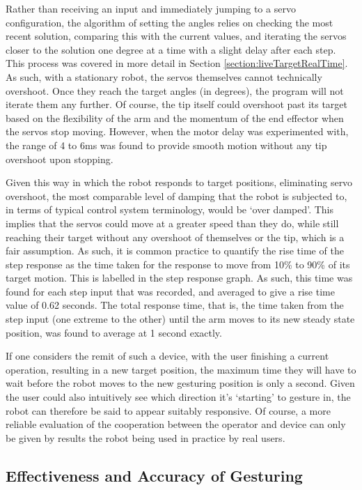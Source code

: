 \documentclass[11pt]{article}
\begin{document}
\pagebreak
Rather than receiving an input and immediately jumping to a servo configuration, the algorithm of setting the angles relies on checking the most recent solution, comparing this with the current values, and iterating the servos closer to the solution one degree at a time with a slight delay after each step. This process was covered in more detail in Section \ref{section:liveTargetRealTime}. As such, with a stationary robot, the servos themselves cannot technically overshoot. Once they reach the target angles (in degrees), the program will not iterate them any further. Of course, the tip itself could overshoot past its target based on the flexibility of the arm and the momentum of the end effector when the servos stop moving. However, when the motor delay was experimented with, the range of 4 to 6ms was found to provide smooth motion without any tip overshoot upon stopping.

Given this way in which the robot responds to target positions, eliminating servo overshoot, the most comparable level of damping that the robot is subjected to, in terms of typical control system terminology, would be `over damped'. This implies that the servos could move at a greater speed than they do, while still reaching their target without any overshoot of themselves or the tip, which is a fair assumption. As such, it is common practice to quantify the rise time of the step response as the time taken for the response to move from 10\% to 90\% of its target motion. This is labelled in the step response graph. As such, this time was found for each step input that was recorded, and averaged to give a rise time value of 0.62 seconds. The total response time, that is, the time taken from the step input (one extreme to the other) until the arm moves to its new steady state position, was found to average at 1 second exactly. 

If one considers the remit of such a device, with the user finishing a current operation, resulting in a new target position, the maximum time they will have to wait before the robot moves to the new gesturing position is only a second. Given the user could also intuitively see which direction it's `starting' to gesture in, the robot can therefore be said to appear suitably responsive. Of course, a more reliable evaluation of the cooperation between the operator and device can only be given by results the robot being used in practice by real users.

\subsection{Effectiveness and Accuracy of Gesturing}
\end{document}
